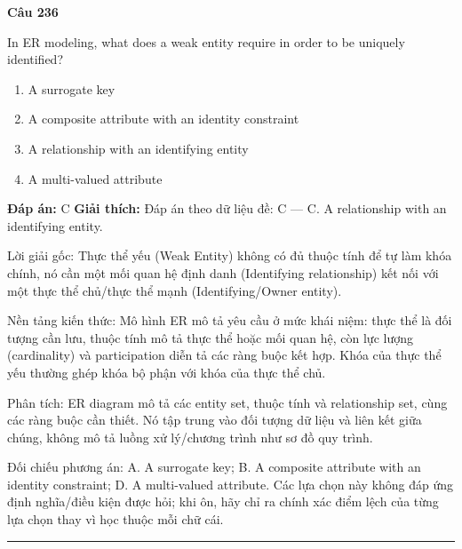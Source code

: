 \documentclass[11pt,a4paper]{article}
\newenvironment{question}[1]{%
  \par\vspace{1em}\noindent\textbf{\large Câu #1}\par\vspace{0.4em}
}{%
  \par\vspace{1em}\hrule\vspace{0.6em}
}
\newenvironment{choices}{%
  \begin{enumerate}[label=\textbf{\Alph*.},leftmargin=2.2em,itemsep=2pt,topsep=3pt]
}{%
  \end{enumerate}
}
\newcommand{\choice}{\item}
\begin{document}
\begin{question}{236}
In ER modeling, what does a weak entity require in order to be uniquely identified?
\begin{choices}
\choice A surrogate key
\choice A composite attribute with an identity constraint
\choice A relationship with an identifying entity
\choice A multi-valued attribute
\end{choices}
\textbf{Đáp án:} C
\textbf{Giải thích:} Đáp án theo dữ liệu đề: C — C. A relationship with an identifying entity.

Lời giải gốc: Thực thể yếu (Weak Entity) không có đủ thuộc tính để tự làm khóa chính, nó cần một mối quan hệ định danh (Identifying relationship) kết nối với một thực thể chủ/thực thể mạnh (Identifying/Owner entity).

Nền tảng kiến thức: Mô hình ER mô tả yêu cầu ở mức khái niệm: thực thể là đối tượng cần lưu, thuộc tính mô tả thực thể hoặc mối quan hệ, còn lực lượng (cardinality) và participation diễn tả các ràng buộc kết hợp. Khóa của thực thể yếu thường ghép khóa bộ phận với khóa của thực thể chủ.

Phân tích: ER diagram mô tả các entity set, thuộc tính và relationship set, cùng các ràng buộc cần thiết. Nó tập trung vào đối tượng dữ liệu và liên kết giữa chúng, không mô tả luồng xử lý/chương trình như sơ đồ quy trình.

Đối chiếu phương án: A. A surrogate key; B. A composite attribute with an identity constraint; D. A multi-valued attribute. Các lựa chọn này không đáp ứng định nghĩa/điều kiện được hỏi; khi ôn, hãy chỉ ra chính xác điểm lệch của từng lựa chọn thay vì học thuộc mỗi chữ cái.
\end{question}
\end{document}
